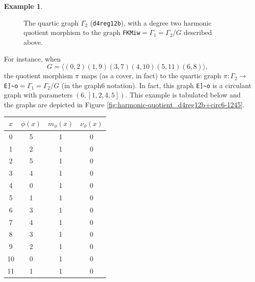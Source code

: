 \documentclass[12pt,letterpaper]{article}
\theoremstyle{definition}
\newtheorem{example}[theorem]{Example}
\begin{document}
\begin{example}
{\begin{figure}[H]
\begin{minipage}{\textwidth}
\begin{center}
%
\end{center}
\end{minipage}
\caption{The quartic graph $\Gamma_2$ ({\tt d4reg12b}), with a degree two harmonic quotient morphism to the graph {\tt FKMiw}$=\Gamma_1=\Gamma_2/G$ described above.}
\label{fig:harmonic-quotient_d4reg12b+FKMiw}
\end{figure}


For instance, when
\[
G = \langle (0,2)(1,9)(3,7)(4,10)(5,11)(6,8) \rangle ,
\]
the quotient morphism $\pi$ maps (as a cover, in fact) to the quartic graph
$\pi: \Gamma_2\to $\verb+E]~o+$=\Gamma_1=\Gamma_2/G$ (in the graph6 notation).
In fact, this graph \verb+E]~o+ is a circulant graph with parameters
$(6, [1, 2, 4, 5])$. This example
is tabulated below and the graphs are depicted in
Figure \ref{fig:harmonic-quotient_d4reg12b+circ6-1245}.
  
\begin{center}
\begin{tabular}{c|c|c|c}  
  $x$ & $\phi(x)$ & $m_\phi(x)$ & $\nu_\phi(x)$ \\ \hline
  0   &    5   &        1         &  0   \\ 
  1   &    2   &        1         &  0  \\ 
  2   &    5   &        1         &  0  \\ 
  3   &    4   &        1         &  0  \\ 
  4   &    0   &        1         &  0   \\
  5   &    1   &        1         &  0   \\
  6   &    3   &        1         &  0   \\
  7   &    4   &        1         &  0   \\
  8   &    3   &        1         &  0   \\
  9   &    2   &        1         &  0   \\
  10   &   0   &        1         &  0  \\   
  11   &   1   &        1         &  0  \\
\end{tabular}
\end{center}

}
\end{example}
\end{document}
